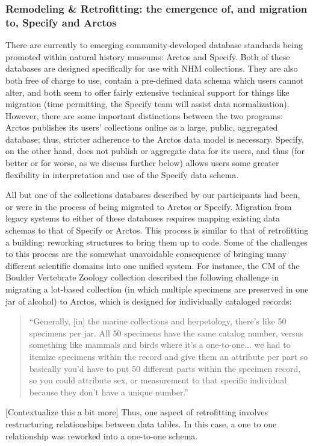 \subsubsection{Remodeling \& Retrofitting: the emergence of, and migration to, Specify and Arctos}

There are currently to emerging community-developed database standards being promoted within natural history museums: Arctos and Specify. Both of these databases are designed specifically for use with NHM collections. They are also both free of charge to use, contain a pre-defined data schema which users cannot alter, and both seem to offer fairly extensive technical support for things like migration (time permitting, the Specify team will assist data normalization). However, there are some important distinctions between the two programs: Arctos publishes its users’ collections online as a large, public, aggregated database; thus, stricter adherence to the Arctos data model is necessary. Specify, on the other hand, does not publish or aggregate data for its users, and thus (for better or for worse, as we discuss further below) allows users some greater flexibility in interpretation and use of the Specify data schema. 

All but one of the collections databases described by our participants had been, or were in the process of being migrated to Arctos or Specify. Migration from legacy systems to either of these databases requires mapping existing data schemas to that of Specify or Arctos. This process is similar to that of retrofitting a building: reworking structures to bring them up to code. Some of the challenges to this process are the somewhat unavoidable consequence of bringing many different scientific domains into one unified system. For instance, the CM of the Boulder Vertebrate Zoology collection described the following challenge in migrating a lot-based collection (in which multiple specimens are preserved in one jar of alcohol) to Arctos, which is designed for individually cataloged records:
\begin{quote}
“Generally, [in] the marine collections and herpetology, there's like 50 specimens per jar. All 50 specimens have the same catalog number, versus something like mammals and birds where it's a one-to-one... we had to itemize specimens within the record and give them an attribute per part so basically you'd have to put 50 different parts within the specimen record, so you could attribute sex, or measurement to that specific individual because they don't have a unique number.”
\end{quote}
[Contextualize this a bit more]
Thus, one aspect of retrofitting involves restructuring relationships between data tables.  In this case, a one to one relationship was reworked into a one-to-one schema.

